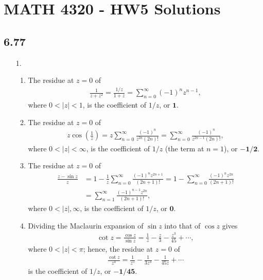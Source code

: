 \documentclass[a4paper,12pt]{article}
\begin{document}
\section*{MATH 4320 - HW5 Solutions}
\subsection*{6.77}
\begin{enumerate}
    \item[1.]
        \begin{enumerate}
            \item
                The residue at $z = 0$ of
                \begin{align*}
                    \frac{1}{z + z^2} = \frac{1/z}{1 + z} = \sum_{n = 0}^\infty (-1)^n z^{n - 1},
                \end{align*}
                where $0 < |z| < 1$, is the coefficient of $1/z$, or $\mathbf{1}$.

            \item
                The residue at $z = 0$ of
                \begin{align*}
                    z \cos \left( \frac{1}{z} \right) = z \sum_{n = 0}^\infty \frac{(-1)^n}{z^{2n} (2n)!} = \sum_{n = 0}^\infty \frac{(-1)^n}{z^{2n - 1} (2n)!},
                \end{align*}
                where $0 < |z| < \infty$, is the coefficient of $1/z$ (the term at $n = 1$), or $\mathbf{-1/2}$.

            \item
                The residue at $z = 0$ of
                \begin{align*}
                    \frac{z - \sin z}{z} &= 1 - \frac{1}{z} \sum_{n = 0}^\infty \frac{(-1)^n z^{2n + 1}}{(2n + 1)!} = 1 - \sum_{n = 0}^\infty \frac{(-1)^n z^{2n}}{(2n + 1)!} \\
                    &= \sum_{n = 1}^\infty \frac{(-1)^{n - 1} z^{2n}}{(2n + 1)!},
                \end{align*}
                where $0 < |z|, \infty$, is the coefficient of $1/z$, or $\mathbf{0}$.

            \item
                Dividing the Maclaurin expansion of $\sin z$ into that of $\cos z$ gives
                \begin{align*}
                    \cot z = \frac{\cos z}{\sin z} = \frac{1}{z} - \frac{z}{3} - \frac{z^3}{45} + \cdots,
                \end{align*}
                where $0 < |z| < \pi$; hence, the residue at $z = 0$ of
                \begin{align*}
                    \frac{\cot z}{z^4} = \frac{1}{z^5} - \frac{1}{3z^3} - \frac{1}{45z} + \cdots
                \end{align*}
                is the coefficient of $1/z$, or $\mathbf{-1/45}$.


\end{enumerate}
\end{enumerate}
\end{document}
